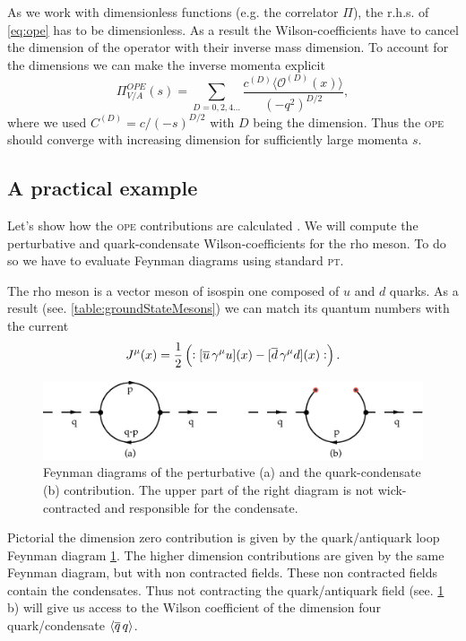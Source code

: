 \documentclass[../../index.tex]{subfiles}
\begin{document}
As we work with dimensionless functions (e.g. the correlator $\Pi$), the r.h.s.
of \cref{eq:ope} has to be dimensionless. As a result the Wilson-coefficients
have to cancel the dimension of the operator with their inverse mass dimension.
To account for the dimensions we can make the inverse momenta explicit
\begin{equation}
  \Pi_{V/A}^{OPE}(s) = \sum_{D=0,2,4\dots} \frac{c^{(D)} \langle \mathcal{O}^{(D)}(x) \rangle}{(-q^2)^{D/2}},
\end{equation}
where we used $C^{(D)}=c/(-s)^{D/2}$ with $D$ being the dimension. Thus the
\textsc{ope} should converge with increasing dimension for sufficiently large
momenta $s$.

\subsection{A practical example}
Let's show how the \textsc{ope} contributions are calculated \cite{Shifman1978,
  Pascual1984}. We will compute the perturbative and quark-condensate
Wilson-coefficients for the rho meson. To do so we have to evaluate Feynman
diagrams using standard \textsc{pt}.

The rho meson is a vector meson of isospin one composed of \(u\) and \(d\)
quarks. As a result (see. \cref{table:groundStateMesons}) we can match its
quantum numbers with the current
\begin{equation}
  J^\mu(x) = \frac{1}{2}\left(:[\overline{u}\, \gamma^\mu u](x) - [\overline{d}\, \gamma^\mu d](x):\right).
\end{equation}
\begin{figure}
  \centering
  \includegraphics[width=\textwidth]{./images/condensateFeynmanDiagram.eps}
  \caption{Feynman diagrams of the perturbative (a) and the quark-condensate (b)
    contribution. The upper part of the right diagram is not wick-contracted and
    responsible for the condensate.}
  \label{fig:OPEFeynmanDiagram}
\end{figure}
Pictorial the dimension zero contribution is given by the quark\-/antiquark loop
Feynman diagram \cref{fig:OPEFeynmanDiagram}. The higher dimension contributions
are given by the same Feynman diagram, but with non contracted fields. These non
contracted fields contain the condensates. Thus not contracting the
quark\-/antiquark field (see. \cref{fig:OPEFeynmanDiagram} b) will give us
access to the Wilson coefficient of the dimension four quark\-/condensate
\(\langle \overline{q}\,q \rangle\).
\end{document}
